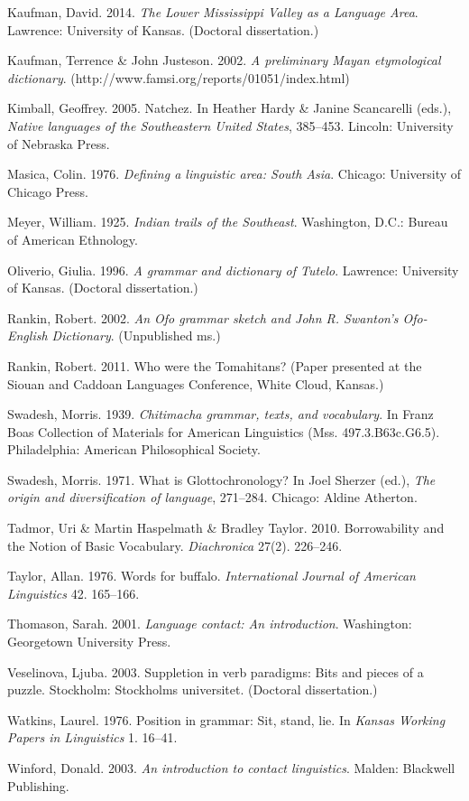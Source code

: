 \documentclass[output=paper]{LSP/langsci}
\begin{document}
\begin{reflist}
Kaufman, David. 2014. \emph{The Lower Mississippi Valley as a Language Area}. Lawrence: University of Kansas. (Doctoral dissertation.)

Kaufman, Terrence \& John Justeson. 2002. \emph{A preliminary Mayan etymological dictionary}. (http://www.famsi.org/reports/01051/index.html)

Kimball, Geoffrey. 2005. Natchez. In Heather Hardy \& Janine Scancarelli (eds.), \emph{Native languages of the Southeastern United States}, 385--453. Lincoln: University of Nebraska Press.

Masica, Colin. 1976. \emph{Defining a linguistic area: South Asia}. Chicago: University of Chicago Press.

Meyer, William. 1925. \emph{Indian trails of the Southeast}. Washington, D.C.: Bureau of American Ethnology.

Oliverio, Giulia. 1996. \emph{A grammar and dictionary of Tutelo}. Lawrence: University of Kansas. (Doctoral dissertation.)

Rankin, Robert. 2002. \emph{An Ofo grammar sketch and John R. Swanton’s Ofo-English Dictionary}. (Unpublished ms.)

Rankin, Robert. 2011. Who were the Tomahitans? (Paper presented at the Siouan and Caddoan Languages Conference, White Cloud, Kansas.)

Swadesh, Morris. 1939. \emph{Chitimacha grammar, texts, and vocabulary}. In Franz Boas Collection of Materials for American Linguistics (Mss. 497.3.B63c.G6.5). Philadelphia: American Philosophical Society.

Swadesh, Morris. 1971. What is Glottochronology? In Joel Sherzer (ed.), \emph{The origin and diversification of language}, 271--284. Chicago: Aldine Atherton.

Tadmor, Uri \& Martin Haspelmath \& Bradley Taylor. 2010. Borrowability and the Notion of Basic Vocabulary. \emph{Diachronica} 27(2). 226--246.

Taylor, Allan. 1976. Words for buffalo. \emph{International Journal of American Linguistics} 42. 165--166.

Thomason, Sarah. 2001. \emph{Language contact: An introduction}. Washington: Georgetown University Press.

Veselinova, Ljuba. 2003. Suppletion in verb paradigms: Bits and pieces of a puzzle. Stockholm: Stockholms universitet. (Doctoral dissertation.)

Watkins, Laurel. 1976. Position in grammar: Sit, stand, lie. In \emph{Kansas Working Papers in Linguistics} 1. 16--41.

Winford, Donald. 2003. \emph{An introduction to contact linguistics}. Malden: Blackwell Publishing.

\end{reflist}
\end{document}
